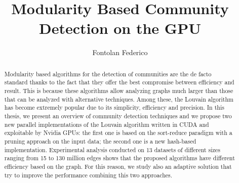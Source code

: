 \documentclass[12pt,a4paper,titlepage]{article}
\title{Modularity Based Community Detection on the GPU}
\author{Fontolan Federico}
\begin{document}
	
	
	\begin{abstract}
		Modularity based algorithms for the detection of communities are the de facto standard thanks to the fact that they offer the best compromise between efficiency and result. 
		This is because these algorithms allow analyzing graphs much larger than those that can be analyzed with alternative techniques. Among these, the Louvain algorithm has become extremely popular due to its simplicity, efficiency and precision.
		In this thesis, we present an overview of community detection techniques and we propose two new parallel implementations of the Louvain algorithm written in CUDA and exploitable by Nvidia GPUs: the first one is based on the sort-reduce paradigm with a pruning approach on the input data; the second one is a new hash-based implementation. Experimental analysis conducted on 13 datasets of different sizes ranging from 15 to 130 million edges shows that the proposed algorithms have different efficiency based on the graph. For this reason, we study also an adaptive solution that try to improve the performance combining this two approaches.
	\end{abstract}

	\tableofcontents
	\newpage
	
	\newpage
	
	\newpage
	
	\newpage
	
	\newpage
	
	\newpage
	
	\newpage
	
	\newpage
	\printbibliography
\end{document}
